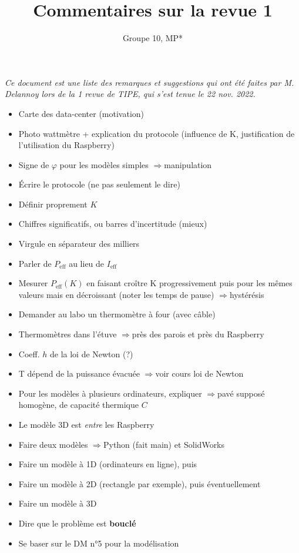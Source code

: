 \documentclass{article}
\title{Commentaires sur la revue 1}
\author{Groupe 10, MP*}
\newcommand*{\eff}{_\text{eff}}
\newcommand{\fleche}{$\Rightarrow {}$}
\begin{document}
\maketitle

\textit{Ce document est une liste des remarques et suggestions qui ont été faites par M. Delannoy lors de la 1 revue de TIPE, qui s'est tenue le 22 nov. 2022.}

\vspace{1cm}

\begin{itemize}
    \item Carte des data-center (motivation)
    \item Photo wattmètre + explication du protocole (influence de K, justification de l'utilisation du Raspberry)
    \item Signe de $\varphi$ pour les modèles simples \fleche manipulation
    \item Écrire le protocole (ne pas seulement le dire)
    \item Définir proprement $K$
    \item Chiffres significatifs, ou barres d'incertitude (mieux)
    \item Virgule en séparateur des milliers
    \item Parler de $P\eff$ au lieu de $I\eff$
    \item Mesurer $P\eff(K)$ en faisant croître K progressivement puis pour les mêmes valeurs mais en décroissant (noter les temps de pause) \fleche hystérésis
    \item Demander au labo un thermomètre à four (avec câble)
    \item Thermomètres dans l'étuve \fleche près des parois et près du Raspberry
    \item Coeff. $h$ de la loi de Newton (?)
    \item T dépend de la puissance évacuée \fleche voir cours loi de Newton
    \item Pour les modèles à plusieurs ordinateurs, expliquer \fleche pavé supposé homogène, de capacité thermique $C$
    \item Le modèle 3D est \textit{entre} les Raspberry
    \item Faire deux modèles \fleche Python (fait main) et SolidWorks
    \item Faire un modèle à 1D (ordinateurs en ligne), puis
    \item Faire un modèle à 2D (rectangle par exemple), puis éventuellement
    \item Faire un modèle à 3D
    \item Dire que le problème est \textbf{bouclé}
    \item Se baser sur le DM n°5 pour la modélisation
\end{itemize}
\end{document}
